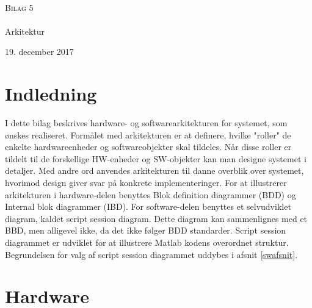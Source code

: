 

\begin{titlingpage}
\begin{center}

~ \\[3cm]


\textsc{\LARGE Bilag 5}\\[1.5cm]


\noindent\makebox[\linewidth]{\rule{\textwidth}{0.4pt}}\\
[0.5cm]{\Huge Arkitektur}
\noindent\makebox[\linewidth]{\rule{\textwidth}{0.4pt}}
\end{center}
\vfill
\begin{center}
{\large 19. december 2017}
\end{center}
\end{titlingpage}

\newpage
\tableofcontents*
\newpage

\chapter{Indledning}

I dette bilag beskrives hardware- og softwarearkitekturen for systemet, som ønskes realiseret. Formålet med arkitekturen er at definere, hvilke "roller" de enkelte hardwareenheder og softwareobjekter skal tildeles. Når disse roller er tildelt til de forskellige HW-enheder og SW-objekter kan man designe systemet i detaljer. Med andre ord anvendes arkitekturen til danne overblik over systemet, hvorimod design giver svar på konkrete implementeringer. For at illustrerer arkitekturen i hardware-delen benyttes Blok definition diagrammer (BDD) og Internal blok diagrammer (IBD). For software-delen benyttes et selvudviklet diagram, kaldet script session diagram. Dette diagram kan sammenlignes med et BBD, men alligevel ikke, da det ikke følger BDD standarder. Script session diagrammet er udviklet for at illustrere Matlab kodens overordnet struktur. Begrundelsen for valg af script session diagrammet uddybes i afsnit \ref{swafsnit}.         


\chapter{Hardware}

